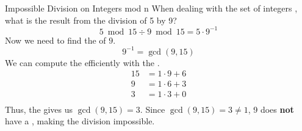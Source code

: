\begin{example}[]{Impossible Division on Integers mod n}
  When dealing with the set of integers , what is the result from the division of 5 by 9?
  \tcblower{}
  \begin{equation*}
    5 \bmod 15 \div 9 \bmod 15 = 5 \cdot 9^{-1}
  \end{equation*}
  Now we need to find the  of $9$.
  \begin{equation*}
    9^{-1} = \gcd(9, 15)
  \end{equation*}
  We can compute the  efficiently with the .
  \begin{align*}
    15 &= 1 \cdot 9 + 6 \\
    9 &= 1 \cdot 6 + 3 \\
    3 &= 1 \cdot 3 + 0 \\
  \end{align*}
  Thus, the  gives us $\gcd(9, 15) = 3$.
  Since $\gcd(9, 15) = 3 \neq 1$, 9 does \textbf{not} have a , making the division impossible.
\end{example}

